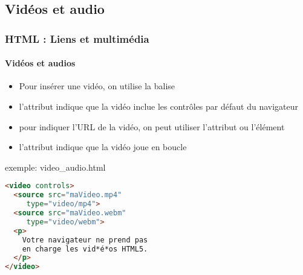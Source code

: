 \documentclass[xcolor=table]{beamer}
\begin{document}
%
%		
%


\subsection{Vidéos et audio}

\begin{frame}[fragile]
\frametitle{HTML : Liens et multimédia}
\framesubtitle{Vidéos et audios}

\begin{minipage}{0.50\textwidth} 
	\begin{itemize}
		\item Pour insérer une vidéo, on utilise la balise 
		\item l'attribut  indique que la vidéo inclue les contrôles par défaut du navigateur
		\item pour indiquer l'URL de la vidéo, on peut utiliser l'attribut  ou l'élément 
		\item l'attribut  indique que la vidéo  joue en boucle
	\end{itemize}
\end{minipage}
%
\begin{minipage}{0.49\textwidth}
\begin{exampleblock}{exemple: video\_audio.html}
\lstset{escapeinside=**}
\scriptsize\bfseries\vspace{-6pt}
\begin{lstlisting}[language={html}]
<video controls>
  <source src="maVideo.mp4" 
     type="video/mp4">
  <source src="maVideo.webm" 
     type="video/webm">
  <p>
    Votre navigateur ne prend pas 
    en charge les vid*é*os HTML5.
  </p>
</video>
\end{lstlisting}\vspace{-6pt}
\end{exampleblock}
\end{minipage}

\end{frame}
\end{document}
